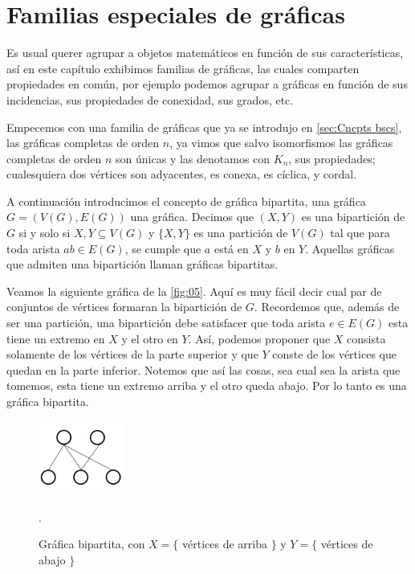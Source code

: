 \section{Familias especiales de gráficas}
\label{sec:Familias especiales de gráficas}

Es usual querer agrupar a objetos matemáticos en función de sus características,
así en este capítulo exhibimos familias de gráficas, las cuales comparten
propiedades en común, por ejemplo podemos agrupar a gráficas en función de sus
incidencias, sus propiedades de conexidad, sus grados, etc. 

Empecemos con una familia de gráficas que ya se introdujo en \cref{sec:Cncpts
bscs}, las gráficas completas de orden $n$, ya vimos que salvo isomorfismos las
gráficas completas de orden $n$ son únicas y las denotamos con $K_n$, sus
propiedades; cualesquiera dos vértices son adyacentes, es conexa, es cíclica, y
cordal.

A continuación introducimos el concepto de gr\'afica bipartita, una gr\'afica
$G=(V(G), E(G))$ una gráfica. Decimos que $(X,Y)$ es una bipartición de $G$ si y
solo si $X,Y \subseteq V(G)$ y $\{X,Y\}$ es una partición de $V(G)$ tal que para
toda arista $ab \in E(G)$, se cumple que $a$ est\'a en $X$ y $b$ en $Y$.
Aquellas gráficas que admiten una bipartici\'on llaman gráficas bipartitas.


Veamos la siguiente gráfica de la \cref{fig:05}. Aquí es muy fácil decir cual
par de conjuntos de vértices formaran la bipartición de $G$. Recordemos que,
adem\'as de ser una partici\'on, una bipartici\'on debe satisfacer que toda
arista $e \in E(G)$ esta tiene un extremo en $X$ y el otro en $Y$. Así, podemos
proponer que $X$ consista solamente de los vértices de la parte superior y que
$Y$ conste de los vértices que quedan en la parte inferior. Notemos que así las
cosas, sea cual sea la arista que tomemos, esta tiene un extremo arriba y el
otro queda abajo. Por lo tanto es una gráfica bipartita.

\begin{figure}[H]
  \centering
  \includegraphics[width=0.25\textwidth]{recursos/capturas/05.jpg}
  \caption{Gráfica bipartita, con $X=\{$ vértices de arriba $\} $ y $Y=\{$
  vértices de abajo $\}$} .
  \label{fig:10}
\end{figure}

